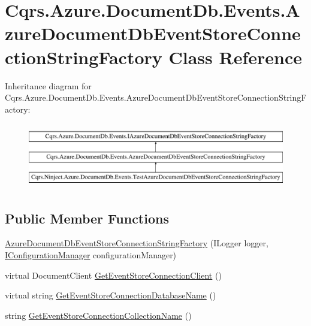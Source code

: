 \hypertarget{classCqrs_1_1Azure_1_1DocumentDb_1_1Events_1_1AzureDocumentDbEventStoreConnectionStringFactory}{}\section{Cqrs.\+Azure.\+Document\+Db.\+Events.\+Azure\+Document\+Db\+Event\+Store\+Connection\+String\+Factory Class Reference}
\label{classCqrs_1_1Azure_1_1DocumentDb_1_1Events_1_1AzureDocumentDbEventStoreConnectionStringFactory}
Inheritance diagram for Cqrs.\+Azure.\+Document\+Db.\+Events.\+Azure\+Document\+Db\+Event\+Store\+Connection\+String\+Factory\+:\begin{figure}[H]
\begin{center}
\leavevmode
\includegraphics[height=2.891566cm]{classCqrs_1_1Azure_1_1DocumentDb_1_1Events_1_1AzureDocumentDbEventStoreConnectionStringFactory}
\end{center}
\end{figure}
\subsection*{Public Member Functions}
\begin{DoxyCompactItemize}
\item 
\hyperlink{classCqrs_1_1Azure_1_1DocumentDb_1_1Events_1_1AzureDocumentDbEventStoreConnectionStringFactory_a7503e00bedc6af5686ded0b6b7719a30}{Azure\+Document\+Db\+Event\+Store\+Connection\+String\+Factory} (I\+Logger logger, \hyperlink{interfaceCqrs_1_1Configuration_1_1IConfigurationManager}{I\+Configuration\+Manager} configuration\+Manager)
\item 
virtual Document\+Client \hyperlink{classCqrs_1_1Azure_1_1DocumentDb_1_1Events_1_1AzureDocumentDbEventStoreConnectionStringFactory_ad221f74db207af105beae4fcb4908db7}{Get\+Event\+Store\+Connection\+Client} ()
\item 
virtual string \hyperlink{classCqrs_1_1Azure_1_1DocumentDb_1_1Events_1_1AzureDocumentDbEventStoreConnectionStringFactory_af243f79315140e1f2c20a5c1695f4fb9}{Get\+Event\+Store\+Connection\+Database\+Name} ()
\item 
string \hyperlink{classCqrs_1_1Azure_1_1DocumentDb_1_1Events_1_1AzureDocumentDbEventStoreConnectionStringFactory_a47a2b2315a2ca8daa9355530a241c133}{Get\+Event\+Store\+Connection\+Collection\+Name} ()
\end{DoxyCompactItemize}
